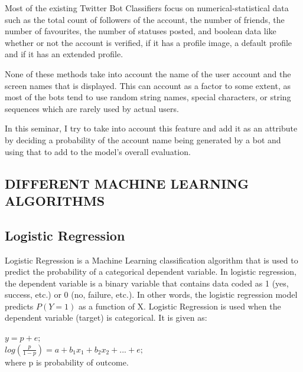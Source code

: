 \documentclass[a4paper, 12pt]{article}
\begin{document}
\hspace{1.5cm} 
Most of the existing Twitter Bot Classifiers focus on numerical-statistical data such as the total count of followers of the account, the number of friends, the number of favourites, the number of statuses posted, and boolean data like whether or not the account is verified, if it has a profile image, a default profile and if it has an extended profile.
\par
\hspace{0.5cm}
None of these methods take into account the name of the user account and the screen names that is displayed. This can account as a factor to some extent, as most of the bots tend to use random string names, special characters, or string sequences which are rarely used by actual users.
\par
\hspace{0.5cm}
In this seminar, I try to take into account this feature and add it as an attribute by deciding a probability of the account name being generated by a bot and using that to add to the model's overall evaluation.



\newpage
\begin{center}
\section{DIFFERENT MACHINE LEARNING ALGORITHMS}
\end{center}

\subsection{Logistic Regression}
Logistic Regression is a Machine Learning classification algorithm that is used to predict the probability of a categorical dependent variable. In logistic regression, the dependent variable is a binary variable that contains data coded as 1 (yes, success, etc.) or 0 (no, failure, etc.). In other words, the logistic regression model predicts $P(Y=1)$ as a function of X. Logistic Regression is used when the dependent variable (target) is categorical. It is given as:

\vspace{0.2cm}
\hfil $y = p + e;$ \\
\vspace{0.3cm}
\hfil $log(\frac{p}{1-p}) = a + b_1 x_1 + b_2 x_2 + ... + e;$ \\
\vspace{0.2cm}
\hfil where p is probability of outcome.
\\
\end{document}

